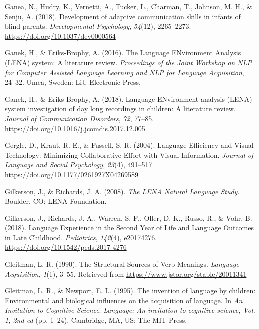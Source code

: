 \documentclass[
  man]{apa6}
\newlength{\cslhangindent}
\newlength{\cslentryspacingunit} %
\newenvironment{CSLReferences}[2] %
 {%
  \setlength{\parindent}{0pt}
  \ifodd #1
  \let\oldpar\par
  \def\par{\hangindent=\cslhangindent\oldpar}
  \fi
  \setlength{\parskip}{#2\cslentryspacingunit}
 }%
 {}
\begin{document}
\begin{CSLReferences}{1}{0}
\leavevmode{}%
Ganea, N., Hudry, K., Vernetti, A., Tucker, L., Charman, T., Johnson, M. H., \& Senju, A. (2018). Development of adaptive communication skills in infants of blind parents. \emph{Developmental Psychology}, \emph{54}(12), 2265--2273. \url{https://doi.org/10.1037/dev0000564}

\leavevmode{}%
Ganek, H., \& Eriks-Brophy, A. (2016). The {Language ENvironment Analysis} ({LENA}) system: {A} literature review. \emph{Proceedings of the Joint Workshop on {NLP} for {Computer Assisted Language Learning} and {NLP} for {Language Acquisition}}, 24--32. Ume{å}, Sweden: LiU Electronic Press.

\leavevmode{}%
Ganek, H., \& Eriks-Brophy, A. (2018). Language {ENvironment} analysis ({LENA}) system investigation of day long recordings in children: {A} literature review. \emph{Journal of Communication Disorders}, \emph{72}, 77--85. \url{https://doi.org/10.1016/j.jcomdis.2017.12.005}

\leavevmode{}%
Gergle, D., Kraut, R. E., \& Fussell, S. R. (2004). Language {Efficiency} and {Visual Technology}: {Minimizing Collaborative Effort} with {Visual Information}. \emph{Journal of Language and Social Psychology}, \emph{23}(4), 491--517. \url{https://doi.org/10.1177/0261927X04269589}

\leavevmode{}%
Gilkerson, J., \& Richards, J. A. (2008). \emph{The {LENA Natural Language Study}}. Boulder, CO: LENA Foundation.

\leavevmode{}%
Gilkerson, J., Richards, J. A., Warren, S. F., Oller, D. K., Russo, R., \& Vohr, B. (2018). Language {Experience} in the {Second Year} of {Life} and {Language Outcomes} in {Late Childhood}. \emph{Pediatrics}, \emph{142}(4), e20174276. \url{https://doi.org/10.1542/peds.2017-4276}

\leavevmode{}%
Gleitman, L. R. (1990). The {Structural Sources} of {Verb Meanings}. \emph{Language Acquisition}, \emph{1}(1), 3--55. Retrieved from \url{https://www.jstor.org/stable/20011341}

\leavevmode{}%
Gleitman, L. R., \& Newport, E. L. (1995). The invention of language by children: {Environmental} and biological influences on the acquisition of language. In \emph{An Invitation to Cognitive Science}. \emph{Language: {An} invitation to cognitive science, {Vol}. 1, 2nd ed} (pp. 1--24). Cambridge, MA, US: The MIT Press.


\end{CSLReferences}
\end{document}
